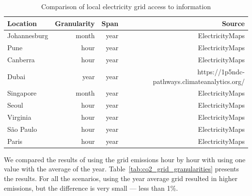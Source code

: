 \begin{table}[H]
  
\caption{Comparison of local electricity grid access to information }\label{tab:grid_emissions_hist} \centering
  
  \begin{tabular}{|l|r|r|r|}
  \hline
    
  \textbf{Location} &   \textbf{Granularity} & \textbf{Span} & \textbf{Source} \\
  \hline
  Johannesburg & month & year & ElectricityMaps  \\
  \hline
  Pune  & hour & year & ElectricityMaps  \\
  \hline
  Canberra  & hour &  year & ElectricityMaps \\
  \hline
  Dubai    & year & year & https://1p5ndc-pathways.climateanalytics.org/  \\
  \hline
  Singapore & month & year & ElectricityMaps \\
  \hline     
  Seoul     & hour & year & ElectricityMaps \\
  \hline
  Virginia  &  hour & year & ElectricityMaps \\
  \hline
  São Paulo & hour & year  & ElectricityMaps \\
  \hline 
  Paris     & hour & year  & ElectricityMaps  \\
  \hline


\end{tabular}  
\end{table}

We compared the results of using the grid emissions hour by hour with using one value with the average of the year. Table~\ref{tab:co2_grid_granularities} presents the results. For all the scenarios, using the  year average grid  resulted in higher emissions, but the difference is very small --- less than 1\%.





